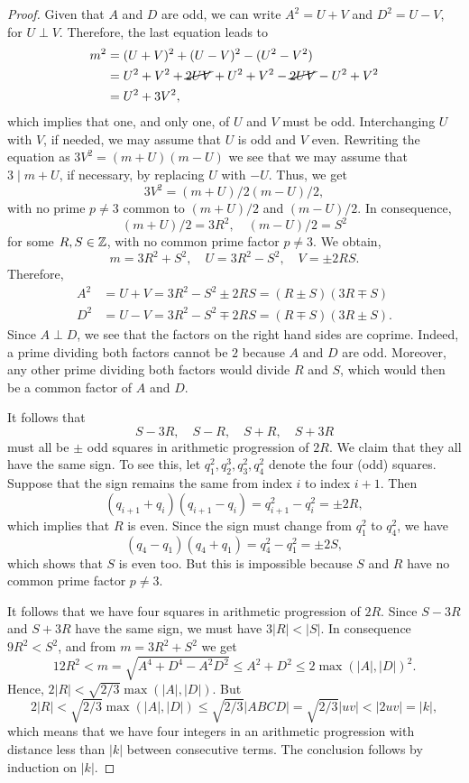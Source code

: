 \begin{proof}
    Given that $A$ and $D$ are odd, we can write $A^2=U+V$ and $D^2=U-V$, for $U\perp V$. Therefore, the last equation leads to
    \begin{align*}
        m^2 &= (U+V)^2 + (U-V)^2 - (U^2-V^2)\\
            &= U^2+V^2 + \cancel{2UV} + U^2 + V^2 - \cancel{2UV} - U^2 + V^2\\
            &= U^2+3V^2,
    \end{align*}
    which implies that one, and only one, of $U$ and $V$ must be odd. Interchanging $U$ with $V$, if needed, we may assume that $U$ is odd and $V$ even. Rewriting the equation as $3V^2=(m+U)(m-U)$ we see that we may assume that $3\mid m+U$, if necessary, by replacing $U$ with $-U$. Thus, we get
    $$
        3V^2 = (m+U)/2(m-U)/2,
    $$
    with no prime $p\ne3$ common to $(m+U)/2$ and $(m-U)/2$. In consequence,
    $$
        (m+U)/2 = 3R^2,\quad(m-U)/2 = S^2
    $$
    for some $R,S\in\mathbb{Z}$, with no common prime factor $p\ne3$. We obtain,
    $$
        m = 3R^2+S^2,\quad U = 3R^2-S^2,\quad V = \pm2RS.
    $$
    Therefore,
    \begin{align*}
        A^2 &= U+V = 3R^2-S^2 \pm2RS = (R\pm S)(3R\mp S)\\
        D^2 &= U-V = 3R^2-S^2 \mp2RS = (R\mp S)(3R\pm S).
    \end{align*}
    Since $A\perp D$, we see that the factors on the right hand sides are coprime. Indeed, a prime dividing both factors cannot be $2$ because $A$ and $D$ are odd. Moreover, any other prime dividing both factors would divide $R$ and $S$, which would then be a common factor of $A$ and $D$.

    It follows that
    $$
        S-3R,\quad S-R,\quad S+R,\quad S+3R  
    $$
    must all be $\pm$ odd squares in arithmetic progression of $2R$. We claim that they all have the same sign. To see this, let $q_1^2,q_2^3,q_3^2,q_4^2$ denote the four (odd) squares. Suppose that the sign remains the same from index $i$ to index $i+1$. Then
    $$
        (q_{i+1}+q_i)(q_{i+1}-q_i)=q_{i+1}^2-q_i^2=\pm2R,
    $$
    which implies that $R$ is even. Since the sign must change from $q_1^2$ to $q_4^2$, we have
    $$
        (q_4-q_1)(q_4+q_1) = q_4^2-q_1^2 = \pm2S,
    $$
    which shows that $S$ is even too. But this is impossible because $S$ and $R$ have no common prime factor $p\ne3$.

    It follows that we have four squares in arithmetic progression of $2R$. Since $S-3R$ and $S+3R$ have the same sign, we must have $3|R|<|S|$. In consequence $9R^2<S^2$, and from $m=3R^2+S^2$ we get
    $$
        12R^2 < m = \sqrt{A^4+D^4-A^2D^2} \le A^2+D^2\le 2\max(|A|,|D|)^2.
    $$
    Hence, $2|R|<\sqrt{2/3}\max(|A|,|D|)$. But
    $$
        2|R| < \sqrt{2/3}\max(|A|,|D|)\le \sqrt{2/3}|ABCD| = \sqrt{2/3}|uv| < |2uv| = |k|,
    $$
    which means that we have four integers in an arithmetic progression with distance less than $|k|$ between consecutive terms. The conclusion follows by induction on $|k|$.
    
\end{proof}

